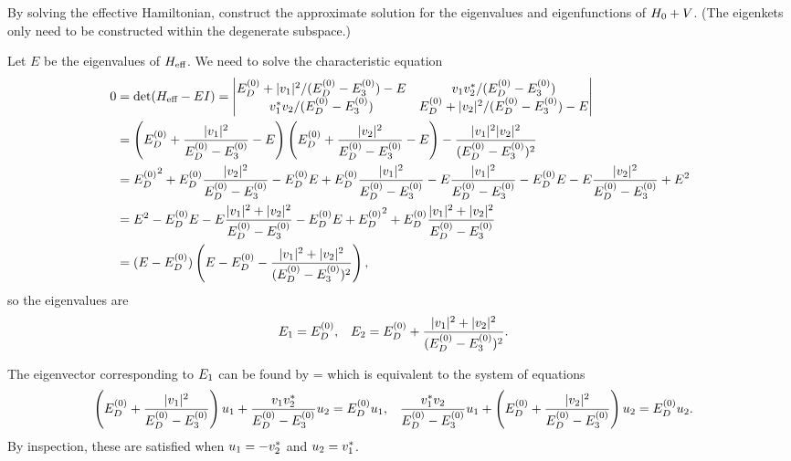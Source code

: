 \newcommand{\uq}{u_1}
\newcommand{\uw}{u_2}
\newcommand{\wq}{w_1}
\newcommand{\ww}{w_2}

\begin{problem}
	By solving the effective Hamiltonian, construct the approximate solution for the eigenvalues and eigenfunctions of $H_0 + V$.  (The eigenkets only need to be constructed within the degenerate subspace.)
\end{problem}

\begin{solution}
	Let $E$ be the eigenvalues of $H_\text{eff}$.  We need to solve the characteristic equation
	\begin{align*}
		0 &= \det(\Heff - E I)
		= \vmqty{ \Eod + |\vq|^2/(\Eod - \Eoe) - E & \vq \vws / (\Eod - \Eoe) \\ \vqs \vw / (\Eod - \Eoe) & \Eod + |\vw|^2/(\Eod - \Eoe) - E } \\
		&= \left( \Eod + \frac{|\vq|^2}{\Eod - \Eoe} - E \right) \left( \Eod + \frac{|\vw|^2}{\Eod - \Eoe} - E \right) - \frac{|\vq|^2 |\vw|^2}{(\Eod - \Eoe)^2} \\
		&= {\Eod}^2 + \Eod \frac{|\vw|^2}{\Eod - \Eoe} - \Eod E + \Eod \frac{|\vq|^2}{\Eod - \Eoe} - E \frac{|\vq|^2}{\Eod - \Eoe} - \Eod E - E \frac{|\vw|^2}{\Eod - \Eoe} + E^2 \\
		&= E^2 - \Eod E - E \frac{|\vq|^2 + |\vw|^2}{\Eod - \Eoe} - \Eod E + {\Eod}^2 + \Eod \frac{|\vq|^2 + |\vw|^2}{\Eod - \Eoe} \\
		&= (E - \Eod) \left( E - \Eod - \frac{|\vq|^2 + |\vw|^2}{(\Eod - \Eoe)^2} \right),
	\end{align*}
	so the eigenvalues are
	\begin{align*}
		E_1 &= E^{(0)}_D, &
		E_2 &= E^{(0)}_D + \frac{|v_1|^2 + |v_2|^2}{(E^{(0)}_D - E^{(0)}_3)^2}.
	\end{align*}
	
	The eigenvector corresponding to $E_1$ can be found by
	\beq
		 \mqty[ \uq \\ \uw ] = \Eod \mqty[ \uq \\ \uw ]
	\eeq
	which is equivalent to the system of equations
	\begin{align*}
		\left( \Eod + \frac{|\vq|^2}{\Eod - \Eoe} \right) \uq + \frac{\vq \vws}{\Eod - \Eoe} \uw &= \Eod \uq, &
		\frac{\vqs \vw}{\Eod - \Eoe} \uq + \left( \Eod + \frac{|\vw|^2}{\Eod - \Eoe} \right) \uw &= \Eod \uw.
	\end{align*}
	By inspection, these are satisfied when $\uq = -\vws$ and $\uw = \vqs$.
	

\end{solution}
